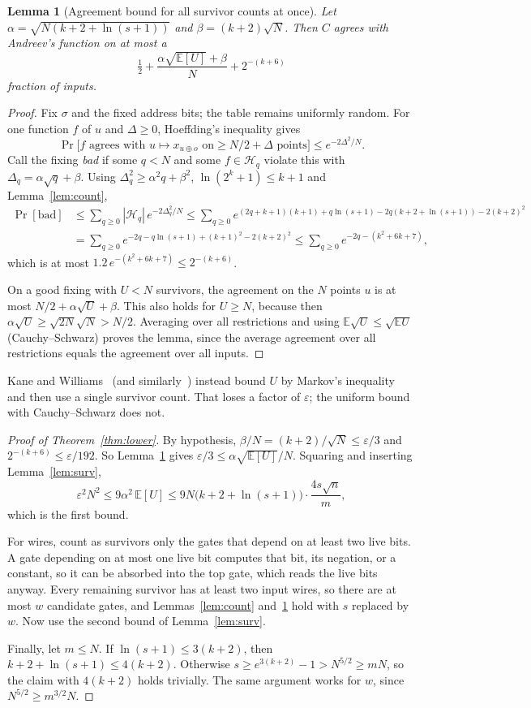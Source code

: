 \documentclass[11pt,letterpaper]{article}
\newtheorem{lemma}[theorem]{Lemma}
\theoremstyle{remark}
\newcommand{\cH}{\mathcal H}
\begin{document}
\begin{lemma}[Agreement bound for all survivor counts at once]\label{lem:avg}
Let $\alpha=\sqrt{N(k+2+\ln(s+1))}$ and $\beta=(k+2)\sqrt N$. Then $C$
agrees with Andreev's function on at most a
\[
\tfrac12+\frac{\alpha\sqrt{\mathbb E[U]}+\beta}{N}+2^{-(k+6)}
\]
fraction of inputs.
\end{lemma}
\begin{proof}
Fix $\sigma$ and the fixed address bits; the table remains uniformly random.
For one function $f$ of $u$ and $\Delta\ge0$, Hoeffding's inequality gives
\[
\Pr\bigl[f\text{ agrees with }u\mapsto x_{u\oplus o}\text{ on}\ge N/2+\Delta\text{ points}\bigr]
\le e^{-2\Delta^2/N}.
\]
Call the fixing \emph{bad} if some $q<N$ and some $f\in\cH_q$ violate this
with $\Delta_q=\alpha\sqrt q+\beta$. Using $\Delta_q^2\ge\alpha^2q+\beta^2$,
$\ln(2^k+1)\le k+1$ and Lemma~\ref{lem:count},
\begin{align*}
\Pr[\text{bad}]&\le\sum_{q\ge0}|\cH_q|\,e^{-2\Delta_q^2/N}
\le\sum_{q\ge0}e^{(2q+k+1)(k+1)+q\ln(s+1)-2q(k+2+\ln(s+1))-2(k+2)^2}\\
&=\sum_{q\ge0}e^{-2q-q\ln(s+1)+(k+1)^2-2(k+2)^2}
\le\sum_{q\ge0}e^{-2q-(k^2+6k+7)},
\end{align*}
which is at most $1.2\,e^{-(k^2+6k+7)}\le2^{-(k+6)}$.

On a good fixing with $U<N$ survivors, the agreement on the $N$ points $u$
is at most $N/2+\alpha\sqrt U+\beta$. This also holds for $U\ge N$, because
then $\alpha\sqrt U\ge\sqrt{2N}\sqrt N>N/2$. Averaging over all restrictions
and using $\mathbb E\sqrt U\le\sqrt{\mathbb E U}$ (Cauchy--Schwarz) proves
the lemma, since the average agreement over all restrictions equals the
agreement over all inputs.
\end{proof}
Kane and Williams~\cite{KW} (and similarly~\cite{KKL,CSS}) instead bound $U$
by Markov's inequality and then use a single survivor count. That loses a
factor of $\varepsilon$; the uniform bound with Cauchy--Schwarz does not.

\begin{proof}[Proof of Theorem~\ref{thm:lower}]
By hypothesis, $\beta/N=(k+2)/\sqrt N\le\varepsilon/3$ and
$2^{-(k+6)}\le\varepsilon/192$. So Lemma~\ref{lem:avg} gives
$\varepsilon/3\le\alpha\sqrt{\mathbb E[U]}/N$. Squaring and inserting
Lemma~\ref{lem:surv},
\[
\varepsilon^2N^2\le9\alpha^2\,\mathbb E[U]\le
9N\bigl(k+2+\ln(s+1)\bigr)\cdot\frac{4s\sqrt n}{m},
\]
which is the first bound.

For wires, count as survivors only the gates that depend on at least two
live bits. A gate depending on at most one live bit computes that bit, its
negation, or a constant, so it can be absorbed into the top gate, which reads
the live bits anyway. Every remaining survivor has at least two input wires,
so there are at most $w$ candidate gates, and Lemmas~\ref{lem:count}
and~\ref{lem:avg} hold with $s$ replaced by $w$. Now use the second bound of
Lemma~\ref{lem:surv}.

Finally, let $m\le N$. If $\ln(s+1)\le3(k+2)$, then $k+2+\ln(s+1)\le4(k+2)$.
Otherwise $s\ge e^{3(k+2)}-1>N^{5/2}\ge mN$, so the claim with $4(k+2)$ holds
trivially. The same argument works for $w$, since $N^{5/2}\ge m^{3/2}N$.
\end{proof}
\end{document}
